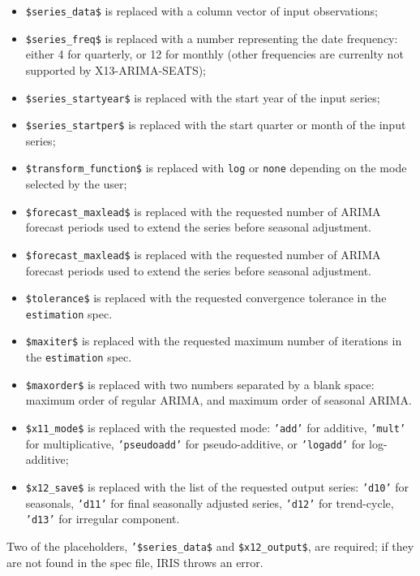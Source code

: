  \begin{itemize}
 \item
   \texttt{\$series\_data\$} is replaced with a column vector of input
   observations;
 \item
   \texttt{\$series\_freq\$} is replaced with a number representing the
   date frequency: either 4 for quarterly, or 12 for monthly (other
   frequencies are currenlty not supported by X13-ARIMA-SEATS);
 \item
   \texttt{\$series\_startyear\$} is replaced with the start year of the
   input series;
 \item
   \texttt{\$series\_startper\$} is replaced with the start quarter or
   month of the input series;
 \item
   \texttt{\$transform\_function\$} is replaced with \texttt{log} or
   \texttt{none} depending on the mode selected by the user;
 \item
   \texttt{\$forecast\_maxlead\$} is replaced with the requested number
   of ARIMA forecast periods used to extend the series before seasonal
   adjustment.
 \item
   \texttt{\$forecast\_maxlead\$} is replaced with the requested number
   of ARIMA forecast periods used to extend the series before seasonal
   adjustment.
 \item
   \texttt{\$tolerance\$} is replaced with the requested convergence
   tolerance in the \texttt{estimation} spec.
 \item
   \texttt{\$maxiter\$} is replaced with the requested maximum number of
   iterations in the \texttt{estimation} spec.
 \item
   \texttt{\$maxorder\$} is replaced with two numbers separated by a
   blank space: maximum order of regular ARIMA, and maximum order of
   seasonal ARIMA.
 \item
   \texttt{\$x11\_mode\$} is replaced with the requested mode:
   \texttt{'add'} for additive, \texttt{'mult'} for multiplicative,
   \texttt{'pseudoadd'} for pseudo-additive, or \texttt{'logadd'} for
   log-additive;
 \item
   \texttt{\$x12\_save\$} is replaced with the list of the requested
   output series: \texttt{'d10'} for seasonals, \texttt{'d11'} for final
   seasonally adjusted series, \texttt{'d12'} for trend-cycle,
   \texttt{'d13'} for irregular component.
 \end{itemize}
 
 Two of the placeholders, \texttt{'\$series\_data\$} and
 \texttt{\$x12\_output\$}, are required; if they are not found in the
 spec file, IRIS throws an error.
 
